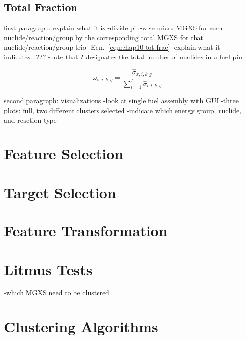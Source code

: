 \clearpage

\subsection{Total Fraction}
\label{subsec:chap10-tot-frac}

first paragraph: explain what it is
-divide pin-wise micro \ac{MGXS} for each nuclide/reaction/group by the corresponding total \ac{MGXS} for that nuclide/reaction/group trio
-Eqn.~\ref{eqn:chap10-tot-frac}
-explain what it indicates...???
-note that $I$ designates the total number of nuclides in a fuel pin

\begin{equation}
\label{eqn:chap10-tot-frac}
\omega_{x,i,k,g} = \frac{\hat{\sigma}_{x,i,k,g}}{\displaystyle\sum\limits_{i=1}^{I}\hat{\sigma}_{t,i,k,g}}
\end{equation}

second paragraph: visualizations
-look at single fuel assembly with GUI
-three plots: full, two different clusters selected
-indicate which energy group, nuclide, and reaction type


\section{Feature Selection}
\label{sec:chap10-litmus}

\section{Target Selection}
\label{sec:chap10-feature-select}

\section{Feature Transformation}
\label{sec:chap10-feature-transform}



\section{Litmus Tests}
\label{sec:chap10-litmus}

-which \ac{MGXS} need to be clustered


\section{Clustering Algorithms}
\label{subsec:chap10-clustering}

